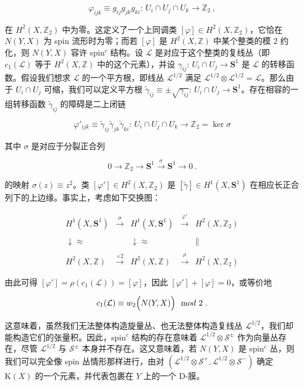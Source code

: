 \documentclass[11pt,a4paper]{ctexart}
\begin{document}
\[\varphi_{ijk}\equiv g_{ij}g_{jk}g_{ki}:\, U_i\cap U_j\cap U_k\longrightarrow
{\mathbb{Z}}_2\ ,\]

在 \(H^2(X,{\mathbb{Z}}_2)\) 中为零。这定义了一个上同调类 \([\varphi]\in H^2(X,{\mathbb{Z}}_2)\)，它恰在 \(N(Y,X)\) 为 spin 流形时为零；而若 \([\varphi]\) 是 \(H^2(X,{\mathbb{Z}})\) 中某个整类的模 2 约化，则 \(N(Y,X)\) 容许 spin\(^c\) 结构。设 \({\mathcal L}\) 是对应于这个整类的复线丛（即 \(c_1({\mathcal L})\) 等于 \(H^2(X,{\mathbb{Z}})\) 中的这个元素），并设 \(\gamma_{ij}:\, U_i\cap U_j\rightarrow {\mathbf S}^1\) 是 \({\mathcal L}\) 的转移函数。假设我们想求 \({\mathcal L}\) 的一个平方根，即线丛 \({\mathcal L}^{1/2}\) 满足 \({\mathcal L}^{1/2}\otimes{\mathcal L}^{1/2}={\mathcal L}\)。那么由于 \(U_i\cap U_j\) 可缩，我们可以定义平方根 \(\tilde{\gamma}_{ij}\equiv\pm\sqrt{\gamma_{ij}}:\, U_i\cap U_j\rightarrow {\mathbf S}^1\)。存在相容的一组转移函数 \(\tilde{\gamma}_{ij}\) 的障碍是二上闭链

\[\varphi'_{ijk}\equiv\tilde{\gamma}_{ij}\tilde{\gamma}_{jk}
\tilde{\gamma}_{ki}:\, U_i\cap U_j\cap U_k\longrightarrow {\mathbb{Z}}_2
=\ker\sigma\]

其中 \(\sigma\) 是对应于分裂正合列

\[0\longrightarrow{\mathbb{Z}}_2\longrightarrow{\mathbf
  S}^1\stackrel{\sigma}{\longrightarrow}
{\mathbf S}^1\longrightarrow 0 \ .\]

的映射 \(\sigma(z)\equiv z^2\)。类 \([\varphi']\in H^2(X,{\mathbb{Z}}_2)\) 是 \([\tilde\gamma]\in H^1(X,{\mathbf S}^1)\) 在相应长正合列下的上边缘。事实上，考虑如下交换图：

\[{\begin{array}{ccccc}
H^1(X,{\mathbf S}^1)&\stackrel{\sigma}{\longrightarrow}&H^1(X,{\mathbf S}^1)
&\stackrel{\varphi'}{\longrightarrow}&H^2(X,{\mathbb{Z}}_2)\\&
&\\\downarrow\approx& &\downarrow\approx& &\parallel \\&
&\\H^2(X,{\mathbb{Z}})&\stackrel{\times2}{\longrightarrow}&H^2(X,{\mathbb{Z}})
&\stackrel{\rho}{\longrightarrow}&H^2(X,{\mathbb{Z}}_2)\end{array}}\]

由此可得 \([\varphi']=\rho(c_1({\mathcal L}))=[\varphi]\)，因此 \([\varphi']+[\varphi]=0\)，或等价地

\[c_1({\mathcal L})\equiv w_2\Bigl(N(Y,X)\Bigr)~~{\mathrm mod}~2 \ .\]

这意味着，虽然我们无法整体构造旋量丛、也无法整体构造复线丛 \({\mathcal L}^{1/2}\)，我们却能构造它们的张量积。因此，spin\(^c\) 结构的存在意味着 \({\mathcal L}^{1/2}\otimes{\mathcal S}^{\pm}\) 作为向量丛存在，尽管 \({\mathcal L}^{1/2}\) 与 \({\mathcal S}^{\pm}\) 本身并不存在。这又意味着，若 \(N(Y,X)\) 是 spin\(^c\) 丛，则我们可以完全像 spin 丛情形那样进行，由对 \(({\mathcal L}^{1/2}\otimes{\mathcal S}^+, {\mathcal L}^{1/2}\otimes{\mathcal S}^-)\) 确定 \({\mathrm K}(X)\) 的一个元素，并代表包裹在 \(Y\) 上的一个 D-膜。
\end{document}
